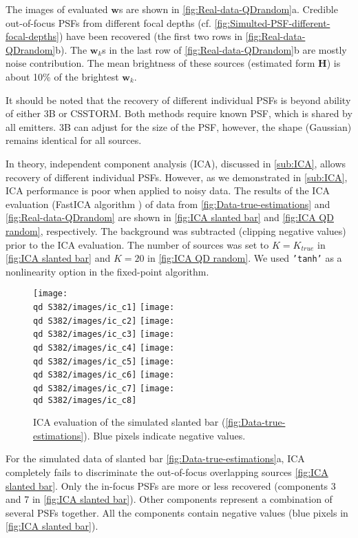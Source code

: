 The images of evaluated $\bm{w}$s are shown in \autoref{fig:Real-data-QDrandom}a. Credible out-of-focus PSFs from different focal depths (cf. \autoref{fig:Simulted-PSF-different-focal-depths}) have been recovered (the first two rows in \autoref{fig:Real-data-QDrandom}b). The $\bm{w}_{k}$s in the last row of \autoref{fig:Real-data-QDrandom}b are mostly noise contribution. The mean brightness of these sources (estimated form $\bm{H}$) is about 10\% of the brightest $\bm{w}_{k}$.

It should be noted that the recovery of different individual PSFs is beyond ability of either 3B or CSSTORM. Both methods require known PSF, which is shared by all emitters. 3B can adjust for the size of the PSF, however, the shape (Gaussian)  remains identical for all sources. 

In theory, independent component analysis (ICA), discussed in \autoref{sub:ICA}, allows recovery of different individual PSFs. However, as we demonstrated in \autoref{sub:ICA}, ICA performance is poor when applied to noisy data. The results of the ICA evaluation (FastICA algorithm \cite{Hyvarinen2000}) of data from \autoref{fig:Data-true-estimations} and \autoref{fig:Real-data-QDrandom} are shown in \autoref{fig:ICA slanted bar} and \autoref{fig:ICA QD random}, respectively. The background was subtracted (clipping negative values) prior to the ICA evaluation. The number of sources was set to $K=K_{true}$ in \autoref{fig:ICA slanted bar} and $K=20$ in \autoref{fig:ICA QD random}. We used {\tt 'tanh'} as a nonlinearity option in the fixed-point algorithm.

\begin{figure}[htb]
	\newcommand{\wf}{.22}
	\newcommand{\barspace}{-.6cm}	
	\centering
	\texttt{[image: \\qd S382/images/ic\_c1]}
	\texttt{[image: \\qd S382/images/ic\_c2]}
	\texttt{[image: \\qd S382/images/ic\_c3]}
	\texttt{[image: \\qd S382/images/ic\_c4]}
	\texttt{[image: \\qd S382/images/ic\_c5]}
	\texttt{[image: \\qd S382/images/ic\_c6]}
	\texttt{[image: \\qd S382/images/ic\_c7]}
	\texttt{[image: \\qd S382/images/ic\_c8]}
	\caption{ICA evaluation of the simulated slanted bar (\autoref{fig:Data-true-estimations}). Blue pixels indicate negative values.}
	\label{fig:ICA slanted bar}
\end{figure}
%
For the simulated data of slanted bar \autoref{fig:Data-true-estimations}a, ICA completely fails to discriminate the out-of-focus overlapping sources \autoref{fig:ICA slanted bar}. Only the in-focus PSFs are more or less recovered (components 3 and 7 in \autoref{fig:ICA slanted bar}). Other components represent  a combination of several PSFs together. All the components contain negative values (blue pixels in \autoref{fig:ICA slanted bar}).

